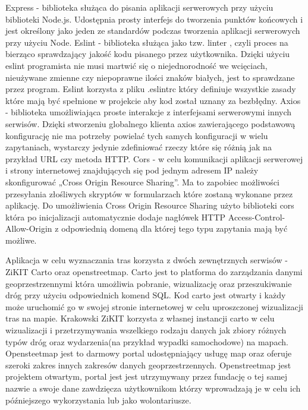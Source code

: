 Express - biblioteka służąca do pisania aplikacji serwerowych przy użyciu biblioteki Node.js. Udostępnia prosty interfejs do tworzenia punktów końcowych i jest określony jako jeden ze standardów podczas tworzenia aplikacji serwerowych przy użyciu Node.\newline
Eslint - biblioteka służąca jako tzw. linter , czyli proces na bierząco sprawdzający jakość kodu pisanego przez użytkownika. Dzięki użyciu eslint programista nie musi martwić się o niejednorodność we wcięciach, nieużywane zmienne czy niepoprawne ilości znaków białych, jest to sprawdzane przez program. Eslint korzysta z pliku .eslintrc który definiuje wszystkie zasady które mają być spełnione w projekcie aby kod został uznany za bezbłędny.
Axios - biblioteka umożliwiająca proste interakcje z interfejsami serwerowymi innych serwisów. Dzięki stworzeniu globalnego klienta axios zawierającego podstawową konfigurację nie ma potrzeby powielać tych samych konfiguracji w wielu zapytaniach, wystarczy jedynie zdefiniować rzeczy które się różnią jak na przykład URL czy metoda HTTP.\newline
Cors - w celu komunikacji aplikacji serwerowej i strony internetowej znajdujących się pod jednym adresem IP należy skonfigurować „Cross Origin Resource Sharing”. Ma to zapobiec możliwości przesyłania złośliwych skryptów w formularzach które zostaną wykonane przez aplikację. Do umożliwienia Cross Origin Resource Sharing użyto biblioteki cors która po inicjalizacji automatycznie dodaje nagłówek HTTP Access-Control-Allow-Origin z odpowiednią domeną dla której tego typu zapytania mają być możliwe.\newline

Aplikacja w celu wyznaczania tras korzysta z dwóch zewnętrznych serwisów - ZiKIT Carto oraz openstreetmap. Carto jest to platforma do zarządzania danymi geoprzestrzennymi która umożliwia pobranie, wizualizację oraz przeszukiwanie dróg przy użyciu odpowiednich komend SQL. Kod carto jest otwarty i każdy może uruchomić go w swojej stronie internetowej w celu uproszczonej wizualizacji tras na mapie. Krakowski ZiKIT korzysta z własnej instancji carto w celu wizualizacji i przetrzymywania wszelkiego rodzaju danych jak zbiory różnych typów dróg oraz wydarzenia(na przykład wypadki samochodowe) na mapach.
Opensteetmap jest to darmowy portal udostępniający usługę map oraz oferuje szeroki zakres innych zakresów danych geoprzestrzennych. Openstreetmap jest projektem otwartym, portal jest jest utrzymywany przez fundację o tej samej nazwie a swoje dane zawdzięcza użytkownikom którzy wprowadzają je w celu ich późniejszego wykorzystania lub jako wolontariusze.


